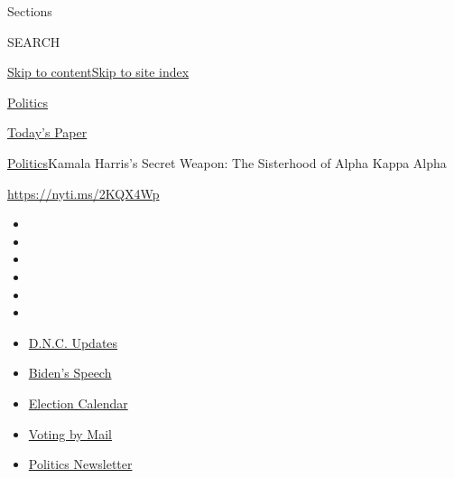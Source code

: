 Sections

SEARCH

\protect\hyperlink{site-content}{Skip to
content}\protect\hyperlink{site-index}{Skip to site index}

\href{https://www.nytimes3xbfgragh.onion/section/politics}{Politics}

\href{https://myaccount.nytimes3xbfgragh.onion/auth/login?response_type=cookie\&client_id=vi}{}

\href{https://www.nytimes3xbfgragh.onion/section/todayspaper}{Today's
Paper}

\href{/section/politics}{Politics}\textbar{}Kamala Harris's Secret
Weapon: The Sisterhood of Alpha Kappa Alpha

\url{https://nyti.ms/2KQX4Wp}

\begin{itemize}
\item
\item
\item
\item
\item
\item
\end{itemize}

\begin{itemize}
\item
  \href{https://www.nytimes3xbfgragh.onion/live/2020/08/20/us/dnc-convention-election?action=click\&pgtype=Article\&state=default\&region=TOP_BANNER\&context=storylines_menu}{D.N.C.
  Updates}
\item
  \href{https://www.nytimes3xbfgragh.onion/2020/08/20/us/politics/biden-presidential-nomination-dnc.html?action=click\&pgtype=Article\&state=default\&region=TOP_BANNER\&context=storylines_menu}{Biden's
  Speech}
\item
  \href{https://www.nytimes3xbfgragh.onion/interactive/2019/us/elections/2020-presidential-election-calendar.html?action=click\&pgtype=Article\&state=default\&region=TOP_BANNER\&context=storylines_menu}{Election
  Calendar}
\item
  \href{https://www.nytimes3xbfgragh.onion/interactive/2020/08/11/us/politics/vote-by-mail-us-states.html?action=click\&pgtype=Article\&state=default\&region=TOP_BANNER\&context=storylines_menu}{Voting
  by Mail}
\item
  \href{https://www.nytimes3xbfgragh.onion/newsletters/politics?action=click\&pgtype=Article\&state=default\&region=TOP_BANNER\&context=storylines_menu}{Politics
  Newsletter}
\end{itemize}

